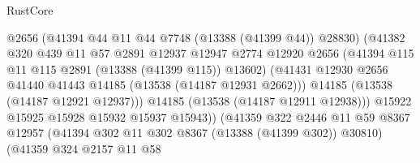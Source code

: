 \begin{lexlean}{RustCore}
\begin{coremodule}
                                          @2656
                                          (@41394 @44 @11 @44 @7748 (@13388 (@41399 @44)) @28830)
                                          (@41382
                                            @320
                                            @439
                                            @11
                                            @57
                                            @2891
                                            @12937
                                            @12947
                                            @2774
                                            @12920
                                            @2656
                                            (@41394
                                              @115
                                              @11
                                              @115
                                              @2891
                                              (@13388 (@41399 @115))
                                              @13602)
                                            (@41431
                                              @12930
                                              @2656
                                              @41440
                                              @41443
                                              @14185
                                              (@13538 (@14187 @12931 @2662)))
                                            @14185
                                            (@13538 (@14187 @12921 @12937)))
                                          @14185
                                          (@13538 (@14187 @12911 @12938)))
                                        @15922
                                        @15925
                                        @15928
                                        @15932
                                        @15937
                                        @15943))
                                    (@41359
                                      @322
                                      @2446
                                      @11
                                      @59
                                      @8367
                                      @12957
                                      (@41394 @302 @11 @302 @8367 (@13388 (@41399 @302)) @30810)
                                      (@41359
                                        @324
                                        @2157
                                        @11
                                        @58

\end{coremodule}
\end{lexlean}
